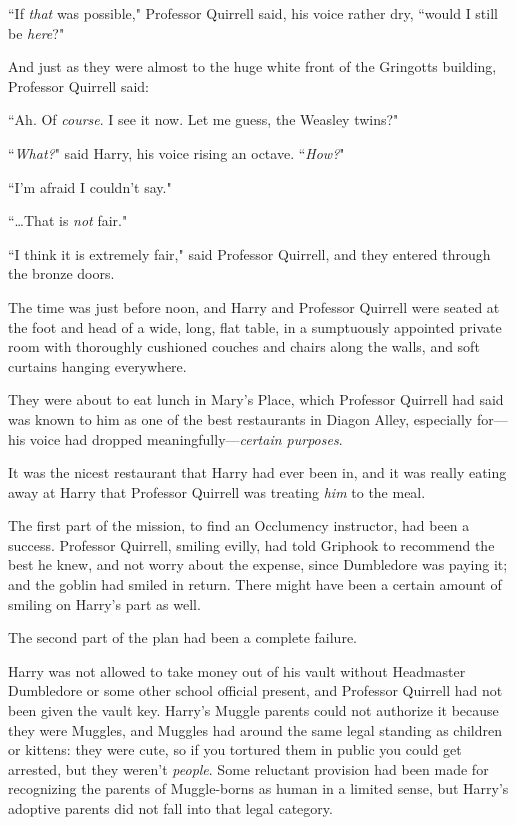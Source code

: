 ``If \emph{that} was possible," Professor Quirrell said, his voice rather dry, ``would I still be \emph{here}?"

And just as they were almost to the huge white front of the Gringotts building, Professor Quirrell said:

``Ah. Of \emph{course}. I see it now. Let me guess, the Weasley twins?"

``\emph{What?}" said Harry, his voice rising an octave.
``\emph{How?}"

``I'm afraid I couldn't say."

``{\ldots}That is \emph{not} fair."

``I think it is extremely fair," said Professor Quirrell, and they entered through the bronze doors.

\later

The time was just before noon, and Harry and Professor Quirrell were seated at the foot and head of a wide, long, flat table, in a sumptuously appointed private room with thoroughly cushioned couches and chairs along the walls, and soft curtains hanging everywhere.

They were about to eat lunch in Mary's Place, which Professor Quirrell had said was known to him as one of the best restaurants in Diagon Alley, especially for---his voice had dropped meaningfully---\emph{certain purposes}.

It was the nicest restaurant that Harry had ever been in, and it was really eating away at Harry that Professor Quirrell was treating \emph{him} to the meal.

The first part of the mission, to find an Occlumency instructor, had been a success. Professor Quirrell, smiling evilly, had told Griphook to recommend the best he knew, and not worry about the expense, since Dumbledore was paying it; and the goblin had smiled in return. There might have been a certain amount of smiling on Harry's part as well.

The second part of the plan had been a complete failure.

Harry was not allowed to take money out of his vault without Headmaster Dumbledore or some other school official present, and Professor Quirrell had not been given the vault key. Harry's Muggle parents could not authorize it because they were Muggles, and Muggles had around the same legal standing as children or kittens: they were cute, so if you tortured them in public you could get arrested, but they weren't \emph{people}. Some reluctant provision had been made for recognizing the parents of Muggle-borns as human in a limited sense, but Harry's adoptive parents did not fall into that legal category.

